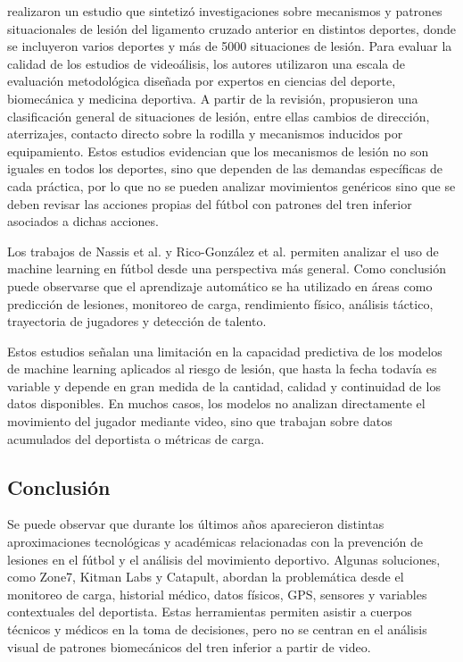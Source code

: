 \textcite{SundbergEtAl2025} realizaron un estudio que sintetizó investigaciones sobre
mecanismos y patrones situacionales de lesión del ligamento cruzado anterior en distintos
deportes, donde se incluyeron varios deportes y más de 5000 situaciones de lesión. Para
evaluar la calidad de los estudios de videoálisis, los autores utilizaron una escala de
evaluación metodológica diseñada por expertos en ciencias del deporte, biomecánica y
medicina deportiva. A partir de la revisión, propusieron una clasificación general de
situaciones de lesión, entre ellas cambios de dirección, aterrizajes, contacto directo sobre
la rodilla y mecanismos inducidos por equipamiento. Estos estudios evidencian que los
mecanismos de lesión no son iguales en todos los deportes, sino que dependen de las demandas
específicas de cada práctica, por lo que no se pueden analizar movimientos genéricos sino
que se deben revisar las acciones propias del fútbol con patrones del tren inferior
asociados a dichas acciones.

Los trabajos de Nassis et al. \parencite{NassisEtAl2023} y Rico-González et al.
\parencite{RicoGonzalezEtAl2023} permiten analizar el uso de machine learning en fútbol
desde una perspectiva más general. Como conclusión puede observarse que el aprendizaje
automático se ha utilizado en áreas como predicción de lesiones, monitoreo de carga,
rendimiento físico, análisis táctico, trayectoria de jugadores y detección de talento.

Estos estudios señalan una limitación en la capacidad predictiva de los modelos de machine
learning aplicados al riesgo de lesión, que hasta la fecha todavía es variable y depende en
gran medida de la cantidad, calidad y continuidad de los datos disponibles. En muchos casos,
los modelos no analizan directamente el movimiento del jugador mediante video, sino que
trabajan sobre datos acumulados del deportista o métricas de carga.

\subsection{Conclusión}

Se puede observar que durante los últimos años aparecieron distintas aproximaciones
tecnológicas y académicas relacionadas con la prevención de lesiones en el fútbol y el
análisis del movimiento deportivo. Algunas soluciones, como Zone7, Kitman Labs y Catapult,
abordan la problemática desde el monitoreo de carga, historial médico, datos físicos, GPS,
sensores y variables contextuales del deportista. Estas herramientas permiten asistir a
cuerpos técnicos y médicos en la toma de decisiones, pero no se centran en el análisis
visual de patrones biomecánicos del tren inferior a partir de video.

